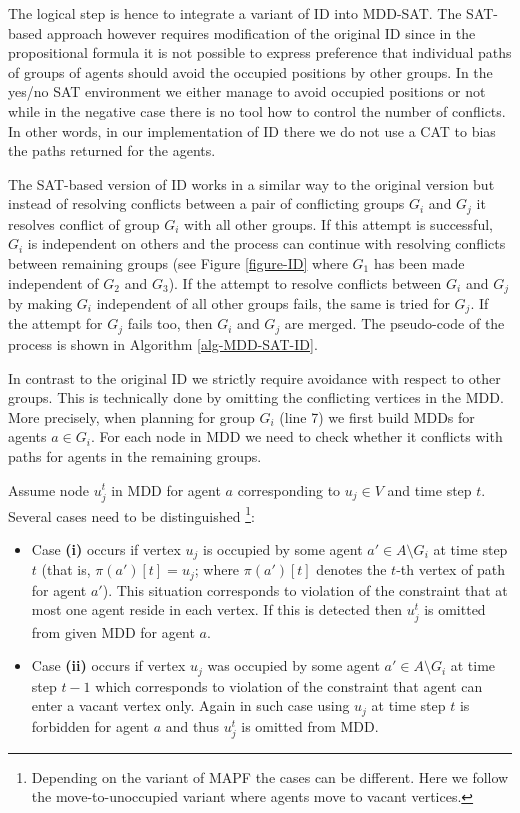 \documentclass[jair,oneside,11pt]{article}
\begin{document}
The logical step is hence to integrate a variant of ID into MDD-SAT. The SAT-based approach however requires modification of the original ID since in the propositional formula it is not possible to express preference that individual paths of groups of agents should avoid the occupied positions by other groups. In the yes/no SAT environment we either manage to avoid occupied positions or not while in the negative case there is no tool how to control the number of conflicts. In other words, in our implementation of ID there we do not use a CAT to bias the paths returned for the agents. 

The SAT-based version of ID works in a similar way to the original version but instead of resolving conflicts between a pair of conflicting groups $G_i$ and $G_j$ it resolves conflict of group $G_i$ with all other groups. If this attempt is successful, $G_i$ is independent on others and the process can continue with resolving conflicts between remaining groups (see Figure \ref{figure-ID} where $G_1$ has been made independent of $G_2$ and $G_3$). If the attempt to resolve conflicts between $G_i$ and $G_j$ by making $G_i$ independent of all other groups fails, the same is tried for $G_j$. If the attempt for $G_j$ fails too, then $G_i$ and $G_j$ are merged. The pseudo-code of the process is shown in Algorithm \ref{alg-MDD-SAT-ID}.

In contrast to the original ID we strictly require avoidance with respect to other groups. This is technically done by omitting the conflicting vertices in the MDD. More precisely, when planning for group $G_i$ (line 7) we first build MDDs for agents $a \in G_i$. For each node in MDD we need to check whether it conflicts with paths for agents in the remaining groups.

Assume node $u_j^t$ in MDD for agent $a$ corresponding to $u_j \in V$ and time step $t$. Several cases need to be distinguished \footnote{Depending on the variant of MAPF the cases can be different. Here we follow the move-to-unoccupied variant where agents move to vacant vertices.}:

\begin{itemize}
\item Case {\bf (i)} occurs if vertex $u_j$ is occupied by some agent $a' \in A \setminus G_i$ at time step $t$ (that is, $\pi(a')[t] = u_j$; where $\pi(a')[t]$ denotes the $t$-th vertex of path for agent $a'$). This situation corresponds to violation of the constraint that at most one agent reside in each vertex. If this is detected then $u_j^t$ is omitted from given MDD for agent $a$.
\item Case {\bf (ii)} occurs if vertex $u_j$ was occupied by some agent $a' \in A \setminus G_i$ at time step $t-1$ which corresponds to violation of the constraint that agent can enter a vacant vertex only. Again in such case using $u_j$ at time step $t$ is forbidden for agent $a$ and thus $u_j^t$ is omitted from MDD.
\end{itemize}
\end{document}
